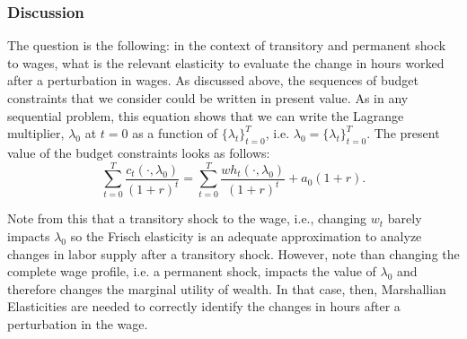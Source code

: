 \documentclass[11pt]{article}
\begin{document}
\subsubsection*{Discussion}
The question is the following: in the context of transitory and permanent shock to wages, what is the relevant elasticity to evaluate the change in hours worked after a perturbation in wages. As discussed above, the sequences of budget constraints that we consider could be written in present value. As in any sequential problem, this equation shows that we can write the Lagrange multiplier, $\lambda_{0}$ at $t=0$ as a function of $\{\lambda_{t}\} _{t=0} ^{T}$, i.e. $\lambda_{0}=\{\lambda_{t}\} _{t=0} ^{T}$. The present value of the budget constraints looks as follows:
\begin{equation}
\sum \limits _{t=0} ^{T} \frac{c_{t}(\cdot,\lambda_{0})}{(1+r)^t}
= \sum \limits _{t=0} ^{T} \frac{wh_{t}(\cdot,\lambda_{0})}{(1+r)^t}+a_{0}(1+r).
\end{equation} \label{eq:ibc}

\indent Note from this that a transitory shock to the wage, i.e., changing $w_{t}$ barely impacts $\lambda_{0}$ so the Frisch elasticity is an adequate approximation to analyze changes in labor supply after a transitory shock. However, note than changing the complete wage profile, i.e. a permanent shock, impacts the value of $\lambda_{0}$ and therefore changes the marginal utility of wealth. In that case, then, Marshallian Elasticities are needed to correctly identify the changes in hours after a perturbation in the wage. 
\end{document}
